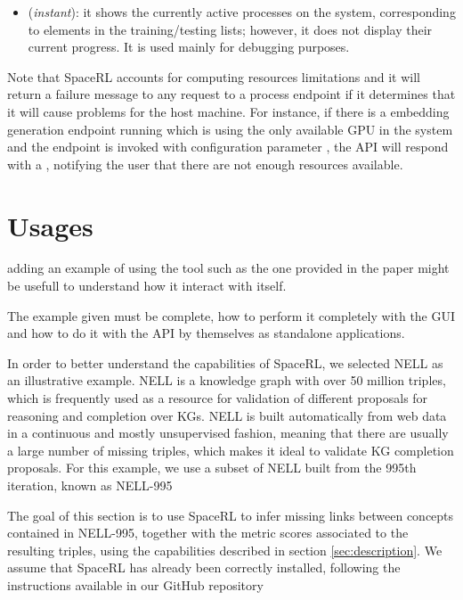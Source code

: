 \begin{itemize}
    \item {} (\emph{instant}): it shows the currently active processes on the system, corresponding to elements in the training/testing lists; however, it does not display their current progress. It is used mainly for debugging purposes.
\end{itemize}

Note that SpaceRL accounts for computing resources limitations and it will return a failure message to any request to a process endpoint if it determines that it will cause problems for the host machine. For instance, if there is a embedding generation endpoint running which is using the only available GPU in the system and the  endpoint is invoked with configuration parameter , the API will respond with a , notifying the user that there are not enough resources available.

\section{Usages}\label{sec:framework-usage}
adding an example of using the tool such as the one provided in the paper might be usefull to understand how it interact with itself.

The example given must be complete, how to perform it completely with the GUI and how to do it with the API by themselves as standalone applications.


In order to better understand the capabilities of SpaceRL,  we selected NELL
as an illustrative example. NELL is a knowledge graph with over 50 million triples, which is frequently used as a resource for validation of different proposals for reasoning and completion over KGs.  NELL is built automatically from web data in a continuous and mostly unsupervised fashion, meaning that there are usually a large number of missing triples, which makes it ideal to validate KG completion proposals. For this example, we use a subset of NELL built from the 995th iteration, known as NELL-995

The goal of this section is to use SpaceRL to infer missing links between concepts contained in NELL-995, together with the metric scores associated to the resulting triples, using the capabilities described in section \ref{sec:description}.  We assume that SpaceRL has already been correctly installed, following the instructions available in our GitHub repository 


